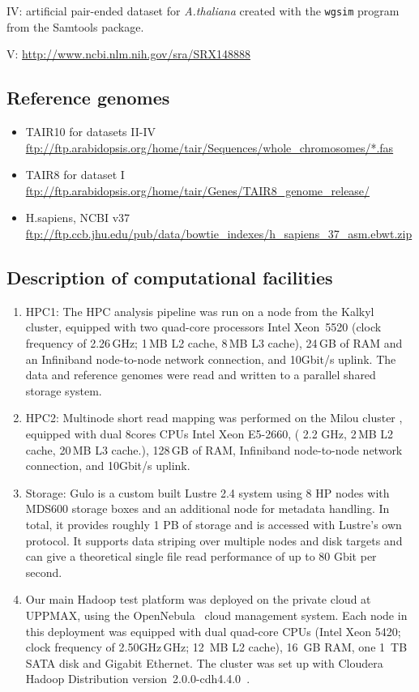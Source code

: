 \documentclass[11pt, oneside]{article}   	%
\begin{document}
IV: artificial pair-ended dataset for {\it A.thaliana} created with the {\tt wgsim} program from the Samtools package.

V: \url{http://www.ncbi.nlm.nih.gov/sra/SRX148888}


\subsection{Reference genomes}
\begin{itemize}
\item TAIR10 for datasets II-IV \url{ftp://ftp.arabidopsis.org/home/tair/Sequences/whole\_chromosomes/*.fas}
\item TAIR8 for dataset I \url{ftp://ftp.arabidopsis.org/home/tair/Genes/TAIR8\_genome\_release/}
\item H.sapiens, NCBI v37 \url{ftp://ftp.ccb.jhu.edu/pub/data/bowtie\_indexes/h\_sapiens\_37\_asm.ebwt.zip}
\end{itemize}

\subsection{Description of computational facilities}

\begin{enumerate}
\item  HPC1:
The HPC analysis pipeline was run on a node from the Kalkyl~\cite{kalkyl} cluster, equipped with two quad-core processors Intel Xeon~5520 (clock frequency of 2.26\,GHz; 1\,MB L2 cache, 8\,MB L3 cache), 24\,GB of RAM and an Infiniband node-to-node network connection, and 10Gbit/s uplink. The data and reference genomes were read and written to a parallel shared storage system. 

\item 
HPC2:
Multinode short read mapping was performed on the Milou cluster\cite{milouCluster} , equipped with dual 8cores CPUs Intel Xeon E5-2660, ( 2.2 GHz, 2\,MB L2 cache, 20\,MB L3 cache.), 128\,GB of RAM, Infiniband node-to-node network connection, and 10Gbit/s uplink.

\item Storage: 
Gulo\cite{gulo} is a custom built Lustre 2.4 system using 8 HP nodes with MDS600 storage boxes and an additional node for metadata handling. In total, it provides roughly 1 PB of storage and is accessed with Lustre's own protocol. It supports data striping over multiple nodes and disk targets and can give a theoretical single file read performance of up to 80 Gbit per second.

\item Our main Hadoop test platform was deployed on the private cloud at UPPMAX, using the OpenNebula~\cite{opennebula} cloud management system. Each node in this deployment was equipped with dual quad-core CPUs (Intel Xeon 5420; clock frequency of 2.50GHz\,GHz; 12~MB L2 cache), 16~GB RAM, one 1~TB SATA disk and Gigabit Ethernet. The cluster was set up with Cloudera Hadoop Distribution version~2.0.0-cdh4.4.0~\cite{cloudera}.

\end{enumerate}



\end{document}
